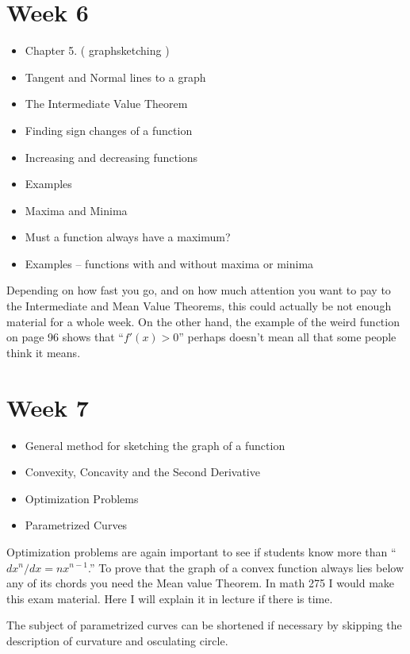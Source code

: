 \documentclass{amsproc}
\begin{document}
\section*{Week 6}
\begin{itemize}
\item Chapter 5. ( graphsketching )
\item Tangent and Normal lines to a graph
\item The Intermediate Value Theorem
\item Finding sign changes of a function
\item Increasing and decreasing functions
\item Examples
\item Maxima and Minima
\item Must a function always have a maximum?
\item Examples -- functions with and without maxima or minima
\end{itemize}
Depending on how fast you go, and on how much attention you want to pay to the
Intermediate and Mean Value Theorems, this could actually be not enough material
for a whole week.
On the other hand, the example of the weird function on page 96 shows that
``$f'(x)>0$'' perhaps doesn't mean all that some people think it means.

\section*{Week 7}
\begin{itemize}
\item General method for sketching the graph of a function
\item Convexity, Concavity and the Second Derivative
\item Optimization Problems
\item Parametrized Curves
\end{itemize}
Optimization problems are again important to see if students know more than
``$dx^n/dx=nx^{n-1}$.''  To prove that the graph of a convex function always
lies below any of its chords you need the Mean value Theorem.  In math 275 I
would make this exam material.  Here I will explain it in lecture if there is
time.

The subject of parametrized curves can be shortened if necessary by skipping the
description of curvature and osculating circle.
\end{document}
